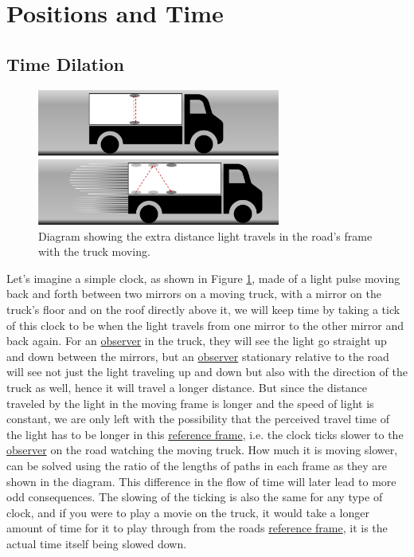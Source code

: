 \section{Positions and Time}

\subsection{Time Dilation}

\begin{figure}[H]
	\centering
	\includegraphics[width=8cm]{images/pdf/lorry_clock.pdf}
	\caption{Diagram showing the extra distance light travels in the road's frame with the truck moving.}
	\label{fig: truck clock}
\end{figure}

Let's imagine a simple clock, as shown in Figure \ref{fig: truck clock}, made of a light pulse moving back and forth between two mirrors on a moving truck, with a mirror on the truck’s floor and on the roof directly above it, we will keep time by taking a tick of this clock to be when the light travels from one mirror to the other mirror and back again. For an \hyperlink{def-observer}{observer} in the truck, they will see the light go straight up and down between the mirrors, but an \hyperlink{def-observer}{observer} stationary relative to the road will see not just the light traveling up and down but also with the direction of the truck as well, hence it will travel a longer distance. But since the distance traveled by the light in the moving frame is longer and the speed of light is constant, we are only left with the possibility that the perceived travel time of the light has to be longer in this \hyperlink{def-Reference-frame}{reference frame}, i.e. the clock ticks slower to the \hyperlink{def-observer}{observer} on the road watching the moving truck. How much it is moving slower, can be solved using the ratio of the lengths of paths in each frame as they are shown in the diagram. This difference in the flow of time will later lead to more odd consequences. The slowing of the ticking is also the same for any type of clock, and if you were to play a movie on the truck, it would take a longer amount of time for it to play through from the roads \hyperlink{def-Reference-frame}{reference frame}, it is the actual time itself being slowed down.

